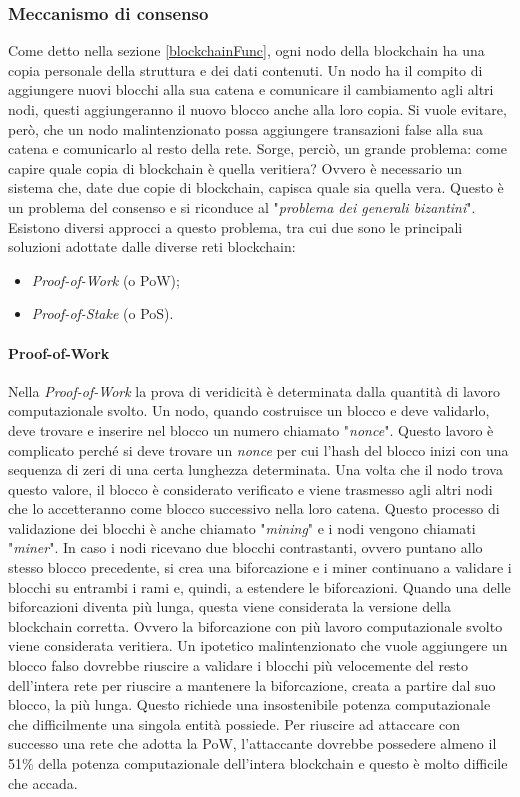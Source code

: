 \documentclass[a4paper]{article}
\begin{document}
    \subsubsection{Meccanismo di consenso}
    Come detto nella sezione \ref{blockchainFunc}, ogni nodo della blockchain ha una copia personale della struttura e dei dati contenuti. Un nodo ha il compito di aggiungere nuovi blocchi alla sua catena e comunicare il cambiamento agli altri nodi, questi aggiungeranno il nuovo blocco anche alla loro copia.
    Si vuole evitare, però, che un nodo malintenzionato possa aggiungere transazioni false alla sua catena e comunicarlo al resto della rete.
    Sorge, perciò, un grande problema: come capire quale copia di blockchain è quella veritiera? Ovvero è necessario un sistema che, date due copie di blockchain, capisca quale sia quella vera. Questo è un problema del consenso e si riconduce al "\emph{problema dei generali bizantini}".
    Esistono diversi approcci a questo problema, tra cui due sono le principali soluzioni adottate dalle diverse reti blockchain:
    \begin{itemize}
      \item \emph{Proof-of-Work} (o PoW);
      \item \emph{Proof-of-Stake} (o PoS).
    \end{itemize}
    \paragraph{Proof-of-Work}
    Nella \emph{Proof-of-Work} la prova di veridicità è determinata dalla quantità di lavoro computazionale svolto. Un nodo, quando costruisce un blocco e deve validarlo, deve trovare e inserire nel blocco un numero chiamato "\emph{nonce}".
    Questo lavoro è complicato perché si deve trovare un \emph{nonce} per cui l'hash del blocco inizi con una sequenza di zeri di una certa lunghezza determinata. Una volta che il nodo trova questo valore, il blocco è considerato verificato e viene trasmesso agli altri nodi che lo accetteranno come blocco successivo nella loro catena.
    Questo processo di validazione dei blocchi è anche chiamato "\emph{mining}" e i nodi vengono chiamati "\emph{miner}".
    In caso i nodi ricevano due blocchi contrastanti, ovvero puntano allo stesso blocco precedente, si crea una biforcazione e i miner continuano a validare i blocchi su entrambi i rami e, quindi, a estendere le biforcazioni. Quando una delle biforcazioni
    diventa più lunga, questa viene considerata la versione della blockchain corretta. Ovvero la biforcazione con più lavoro computazionale svolto viene considerata veritiera. 
    Un ipotetico malintenzionato che vuole aggiungere un blocco falso dovrebbe riuscire a validare i blocchi più velocemente del resto dell'intera rete per riuscire a mantenere la biforcazione, creata a partire dal suo blocco, la più lunga. Questo richiede una insostenibile potenza computazionale che difficilmente una singola entità possiede.
    Per riuscire ad attaccare con successo una rete che adotta la PoW, l'attaccante dovrebbe possedere almeno il 51\% della potenza computazionale dell'intera blockchain e questo è molto difficile che accada.
\end{document}
